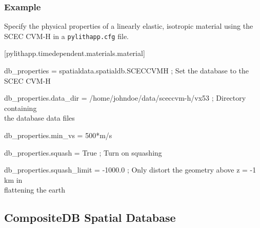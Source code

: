 \subsubsection{Example}

Specify the physical properties of a linearly elastic, isotropic material
using the SCEC CVM-H in a \texttt{pylithapp.cfg} file.
\begin{lyxcode}
{\small{}{[}pylithapp.timedependent.materials.material{]}}{\small \par}

{\small{}db\_properties = spatialdata.spatialdb.SCECCVMH ; Set the database to the SCEC CVM-H}{\small \par}

{\small{}db\_properties.data\_dir = /home/johndoe/data/sceccvm-h/vx53 ; Directory containing} \\
{\small{}the database data files}{\small \par}

{\small{}db\_properties.min\_vs = 500{*}m/s}{\small \par}

{\small{}db\_properties.squash = True ; Turn on squashing}{\small \par}

{\small{}db\_properties.squash\_limit = -1000.0 ; Only distort the geometry above z = -1 km in } \\
{\small{}flattening the earth}{\small \par}
\end{lyxcode}

\subsection{CompositeDB Spatial Database}

